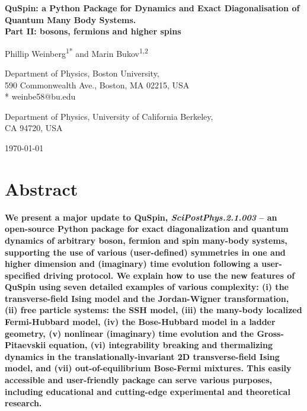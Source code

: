\documentclass{SciPost}
\newcommand\0{\scalebox{-1}[1]{0}}
\begin{document}
\begin{center}{\Large \textbf{
QuSpin: a Python Package for Dynamics and Exact Diagonalisation of Quantum Many Body Systems.\\
\large Part II: bosons, fermions and higher spins
}}\end{center}

\begin{center}
Phillip Weinberg\textsuperscript{1*} and Marin Bukov\textsuperscript{1,2}
\end{center}

\begin{center}
Department of Physics, Boston University, \\
590 Commonwealth Ave., Boston, MA 02215, USA
\\
* weinbe58@bu.edu
\end{center}

\begin{center}
Department of Physics, University of California Berkeley, \\
CA 94720, USA
\\
\end{center}

\begin{center}
\today
\end{center}


\section*{Abstract}
{\bf 
We present a major update to QuSpin, \emph{SciPostPhys.2.1.003} -- an open-source Python package for exact diagonalization and quantum dynamics of arbitrary boson, fermion and spin many-body systems, supporting the use of various (user-defined) symmetries in one and higher dimension and (imaginary) time evolution following a user-specified driving protocol. We explain how to use the new features of QuSpin using seven detailed examples of various complexity: (i) the transverse-field Ising model and the Jordan-Wigner transformation, (ii) free particle systems: the SSH model, (iii) the many-body localized Fermi-Hubbard model, (iv) the Bose-Hubbard model in a ladder geometry, (v) nonlinear (imaginary) time evolution and the Gross-Pitaevskii equation, (vi) integrability breaking and thermalizing dynamics in the translationally-invariant 2D transverse-field Ising model, and (vii) out-of-equilibrium Bose-Fermi mixtures. This easily accessible and user-friendly package can serve various purposes, including educational and cutting-edge experimental and theoretical research.
}
\end{document}
